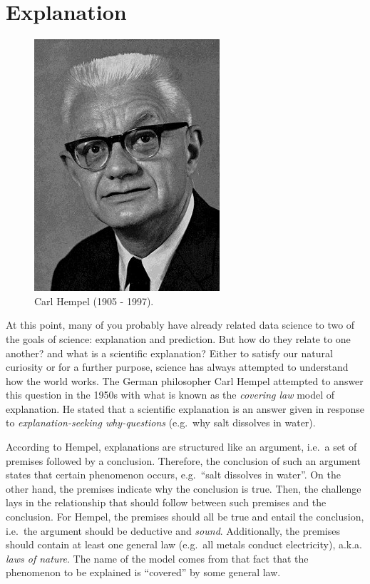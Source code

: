 \documentclass[
]{book}
\begin{document}
\hypertarget{explanation}{%
\section{Explanation}\label{explanation}}

\begin{figure}  
 \begin{center}
    \includegraphics[width=.22\textwidth]{Figures/Carl_Gustav_Hempel.jpg}  
  \captionsetup{labelformat=empty}
  \caption{Carl Hempel (1905 - 1997).} 
\end{center}
\end{figure}
\addtocounter{figure}{-1}

At this point, many of you probably have already related data science to two of the goals of science: explanation and prediction. But how do they relate to one another? and what is a scientific explanation? Either to satisfy our natural curiosity or for a further purpose, science has always attempted to understand how the world works. The German philosopher Carl Hempel attempted to answer this question in the 1950s with what is known as the \emph{covering law} model of explanation. He stated that a scientific explanation is an answer given in response to \emph{explanation-seeking why-questions} (e.g.~why salt dissolves in water).

According to Hempel, explanations are structured like an argument, i.e.~a set of premises followed by a conclusion. Therefore, the conclusion of such an argument states that certain phenomenon occurs, e.g.~``salt dissolves in water''. On the other hand, the premises indicate why the conclusion is true. Then, the challenge lays in the relationship that should follow between such premises and the conclusion. For Hempel, the premises should all be true and entail the conclusion, i.e.~the argument should be deductive and \emph{sound}. Additionally, the premises should contain at least one general law (e.g.~all metals conduct electricity), a.k.a. \emph{laws of nature}. The name of the model comes from that fact that the phenomenon to be explained is ``covered'' by some general law.
\end{document}
